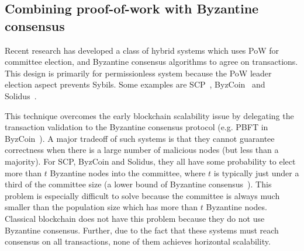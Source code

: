 
\subsection{Combining proof-of-work with Byzantine consensus}
Recent research has developed a class of hybrid systems which uses PoW for committee election,
and Byzantine consensus algorithms to agree on transactions.
This design is primarily for permissionless system because the PoW leader election aspect prevents Sybils.
Some examples are SCP~\cite{luu2015scp}, ByzCoin~\cite{kogias2016enhancing} and Solidus~\cite{abraham2016solidus}.

This technique overcomes the early blockchain scalability issue by delegating the transaction validation to the Byzantine consensus protocol (e.g. PBFT in ByzCoin~\cite{kogias2016enhancing}).
A major tradeoff of such systems is that they cannot guarantee correctness when there is a large number of malicious nodes (but less than a majority).
For SCP, ByzCoin and Solidus, they all have some probability to elect more than $t$ Byzantine nodes into the committee,
where $t$ is typically just under a third of the committee size (a lower bound of Byzantine consensus~\cite{pease1980reaching}).
This problem is especially difficult to solve because the committee is always much smaller than the population size which has more than $t$ Byzantine nodes.
Classical blockchain does not have this problem because they do not use Byzantine consensus.
Further, due to the fact that these systems must reach consensus on all transactions, none of them achieves horizontal scalability.


